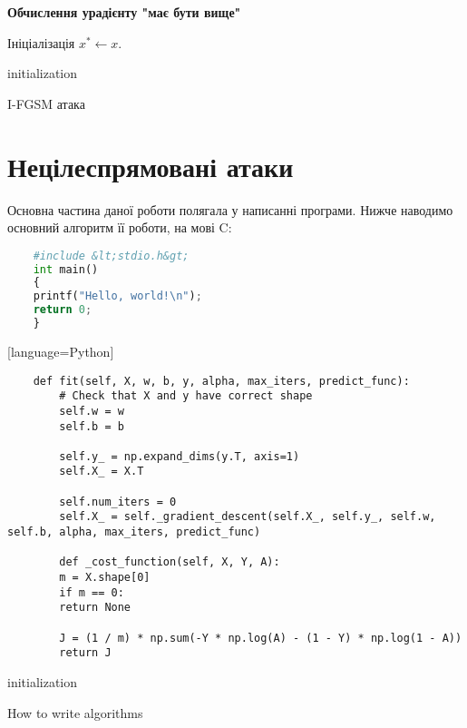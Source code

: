\documentclass[a4paper,14pt]{extreport}
\begin{document}
	\textbf{Обчислення урадієнту "має бути вище"}
	
	\begin{algorithm}[H]		
		\SetAlgoLined
		
		Ініціалізація $x^{*} \leftarrow x. $
		
		initialization\;
		\caption{I-FGSM атака}
	\end{algorithm}
	
	\section{Нецілеспрямовані атаки} 
	Основна частина даної роботи полягала у написанні програми. Нижче наводимо основний алгоритм її роботи, на мові C:
	
	\begin{lstlisting}[language=Python]
	% ============================================ %
	#include &lt;stdio.h&gt;
	int main() 
	{ 
	printf("Hello, world!\n"); 
	return 0; 
	} 
	\end{lstlisting}[language=Python]

	\lstset{language=Python}
	\begin{lstlisting}
	def fit(self, X, w, b, y, alpha, max_iters, predict_func):
		# Check that X and y have correct shape
		self.w = w
		self.b = b
		
		self.y_ = np.expand_dims(y.T, axis=1)
		self.X_ = X.T
		
		self.num_iters = 0
		self.X_ = self._gradient_descent(self.X_, self.y_, self.w, self.b, alpha, max_iters, predict_func)
		
		def _cost_function(self, X, Y, A):
		m = X.shape[0]
		if m == 0:
		return None
		
		J = (1 / m) * np.sum(-Y * np.log(A) - (1 - Y) * np.log(1 - A))
		return J
	\end{lstlisting}
	
	\begin{algorithm}[H]
		\SetAlgoLined
		initialization\;
		\caption{How to write algorithms}
	\end{algorithm}
	
\end{document}

